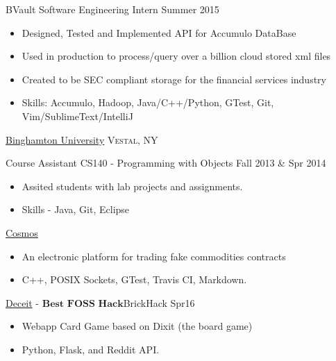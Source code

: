 \documentclass[11pt]{article}
\begin{document}
\headedsection  %
{}
{} {
    \headedsubsection
    {BVault Software Engineering Intern}
    {Summer 2015}
    {
        \begin{itemize}
            \item Designed, Tested and Implemented API for Accumulo DataBase
            \item Used in production to process/query over a billion cloud stored xml files
            \item Created to be SEC compliant storage for the financial services industry
            \item Skills: Accumulo, Hadoop, Java/C++/Python, GTest, Git, Vim/SublimeText/IntelliJ
        \end{itemize}
    }
}

\headedsection
{\href{}{Binghamton University}}
{\textsc{Vestal, NY}} {
    \headedsubsection
    {Course Assistant CS140 - Programming with Objects}
    {Fall 2013 \& Spr 2014}
    {
        \begin{itemize}
            \item Assited students with lab projects and assignments.
            \item Skills - Java, Git, Eclipse
        \end{itemize}
    }
}


\spacedhrule{0.1em}{0.5em}  %

\projects
{{\href{https://github.com/gabeochoa/Cosmos}{Cosmos}}}{}
{
    \begin{itemize}[label={}]
        \setlength\itemsep{.005ex}
        \item{An electronic platform for trading fake commodities contracts}
        \item{C++, POSIX Sockets, GTest, Travis CI, Markdown.}
    \end{itemize}
}

\projects
{{\href{https://github.com/gabeochoa/sokim}{Deceit}} - $\textbf{Best FOSS Hack}$}{BrickHack Spr16}
{
    \begin{itemize}[label={}]
        \setlength\itemsep{.005ex}
        \item{Webapp Card Game based on Dixit (the board game)}
        \item{Python, Flask, and Reddit API.}
    \end{itemize}
}
\end{document}
